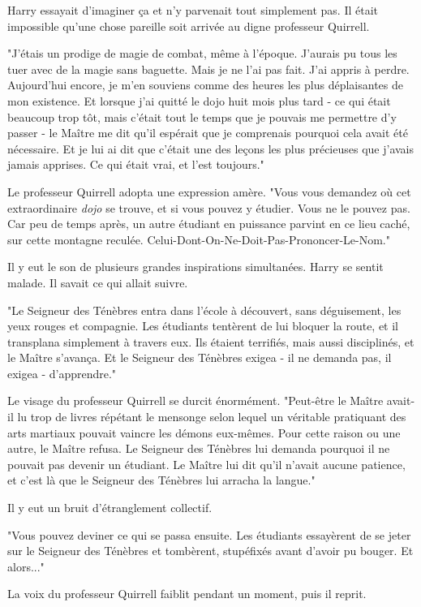 Harry essayait d'imaginer ça et n'y parvenait tout simplement pas. Il était impossible qu'une chose pareille soit arrivée au digne professeur Quirrell.

"J'étais un prodige de magie de combat, même à l'époque. J'aurais pu tous les tuer avec de la magie sans baguette. Mais je ne l'ai pas fait. J'ai appris à perdre. Aujourd'hui encore, je m'en souviens comme des heures les plus déplaisantes de mon existence. Et lorsque j'ai quitté le dojo huit mois plus tard - ce qui était beaucoup trop tôt, mais c'était tout le temps que je pouvais me permettre d'y passer - le Maître me dit qu'il espérait que je comprenais pourquoi cela avait été nécessaire. Et je lui ai dit que c'était une des leçons les plus précieuses que j'avais jamais apprises. Ce qui était vrai, et l'est toujours."

Le professeur Quirrell adopta une expression amère. "Vous vous demandez où cet extraordinaire \emph{dojo}  se trouve, et si vous pouvez y étudier. Vous ne le pouvez pas. Car peu de temps après, un autre étudiant en puissance parvint en ce lieu caché, sur cette montagne reculée. Celui-Dont-On-Ne-Doit-Pas-Prononcer-Le-Nom."

Il y eut le son de plusieurs grandes inspirations simultanées. Harry se sentit malade. Il savait ce qui allait suivre.

"Le Seigneur des Ténèbres entra dans l'école à découvert, sans déguisement, les yeux rouges et compagnie. Les étudiants tentèrent de lui bloquer la route, et il transplana simplement à travers eux. Ils étaient terrifiés, mais aussi disciplinés, et le Maître s'avança. Et le Seigneur des Ténèbres exigea - il ne demanda pas, il exigea - d'apprendre."

Le visage du professeur Quirrell se durcit énormément. "Peut-être le Maître avait-il lu trop de livres répétant le mensonge selon lequel un véritable pratiquant des arts martiaux pouvait vaincre les démons eux-mêmes. Pour cette raison ou une autre, le Maître refusa. Le Seigneur des Ténèbres lui demanda pourquoi il ne pouvait pas devenir un étudiant. Le Maître lui dit qu'il n'avait aucune patience, et c'est là que le Seigneur des Ténèbres lui arracha la langue."

Il y eut un bruit d'étranglement collectif.

"Vous pouvez deviner ce qui se passa ensuite. Les étudiants essayèrent de se jeter sur le Seigneur des Ténèbres et tombèrent, stupéfixés avant d'avoir pu bouger. Et alors..."

La voix du professeur Quirrell faiblit pendant un moment, puis il reprit.

